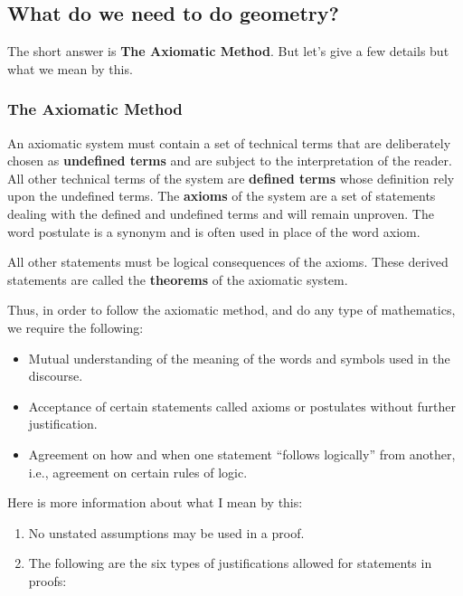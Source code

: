 \documentclass[
  twoside,
  12pt,
  letterpaper,
  fleqn]{article}
\providecommand{\tightlist}{%
  \setlength{\itemsep}{0pt}\setlength{\parskip}{0pt}}\usepackage{longtable,booktabs,array}
\theoremstyle{definition}
\theoremstyle{definition}
\theoremstyle{plain}
\theoremstyle{plain}
\theoremstyle{remark}
\begin{document}
\hypertarget{what-do-we-need-to-do-geometry}{%
\subsection{What do we need to do
geometry?}\label{what-do-we-need-to-do-geometry}}

The short answer is \textbf{The Axiomatic Method}. But let's give a few
details but what we mean by this.

\hypertarget{the-axiomatic-method}{%
\subsubsection{The Axiomatic Method}\label{the-axiomatic-method}}

An axiomatic system must contain a set of technical terms that are
deliberately chosen as \textbf{undefined terms} and are subject to the
interpretation of the reader. All other technical terms of the system
are \textbf{defined terms} whose definition rely upon the undefined
terms. The \textbf{axioms} of the system are a set of statements dealing
with the defined and undefined terms and will remain unproven. The word
postulate is a synonym and is often used in place of the word axiom.

All other statements must be logical consequences of the axioms. These
derived statements are called the \textbf{theorems} of the axiomatic
system.

Thus, in order to follow the axiomatic method, and do any type of
mathematics, we require the following:

\begin{itemize}
\tightlist
\item
  Mutual understanding of the meaning of the words and symbols used in
  the discourse.
\item
  Acceptance of certain statements called axioms or postulates without
  further justification.
\item
  Agreement on how and when one statement ``follows logically'' from
  another, i.e., agreement on certain rules of logic.
\end{itemize}

Here is more information about what I mean by this:

\begin{enumerate}
\def\labelenumi{\arabic{enumi}.}
\tightlist
\item
  No unstated assumptions may be used in a proof.
\item
  The following are the six types of justifications allowed for
  statements in proofs:
\end{enumerate}
\end{document}
